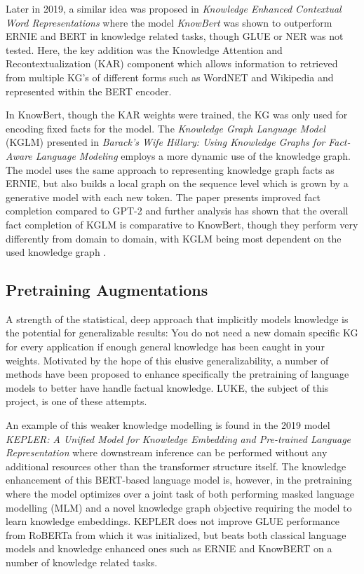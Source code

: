 \documentclass[main.tex]{subfiles}
\begin{document}
Later in 2019, a similar idea was proposed in \emph{Knowledge Enhanced Contextual Word Representations} where the model \emph{KnowBert} \cite{peters2019knowbert} was shown to outperform ERNIE and BERT in knowledge related tasks, though GLUE or NER was not tested.
Here, the key addition was the Knowledge Attention and Recontextualization (KAR) component which allows information to retrieved from multiple KG's of different forms such as WordNET and Wikipedia and represented within the BERT encoder.

In KnowBert, though the KAR weights were trained, the KG was only used for encoding fixed facts for the model.
The \emph{Knowledge Graph Language Model} (KGLM) presented in \emph{Barack’s Wife Hillary: Using Knowledge Graphs for Fact-Aware Language Modeling} \cite{logan2019barack} employs a more dynamic use of the knowledge graph.
The model uses the same approach to representing knowledge graph facts as ERNIE, but also builds a local graph on the sequence level which is grown by a generative model with each new token.
The paper presents improved fact completion compared to GPT-2 and further analysis has shown that the overall fact completion of KGLM is comparative to KnowBert, though they perform very differently from domain to domain, with KGLM being most dependent on the used knowledge graph \cite{birk2020knowledge}.

\subsection{Pretraining Augmentations}
A strength of the statistical, deep approach that implicitly models knowledge is the potential for generalizable results:
You do not need a new domain specific KG for every application if enough general knowledge has been caught in your weights.
Motivated by the hope of this elusive generalizability, a number of methods have been proposed to enhance specifically the pretraining of language models to better have handle factual knowledge.
LUKE, the subject of this project, is one of these attempts.

An example of this weaker knowledge modelling is found in the 2019 model \emph{KEPLER: A Unified Model for Knowledge Embedding and Pre-trained Language Representation} \cite{wang2021kepler} where downstream inference can be performed without any additional resources other than the transformer structure itself.
The knowledge enhancement of this BERT-based language model is, however, in the pretraining where the model optimizes over a joint task of both performing masked language modelling (MLM) and a novel knowledge graph objective requiring the model to learn knowledge embeddings.
KEPLER does not improve GLUE performance from RoBERTa \cite{liu2019roberta} from which it was initialized, but beats both classical language models and knowledge enhanced ones such as ERNIE and KnowBERT on a number of knowledge related tasks.
\end{document}
